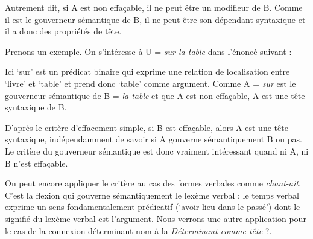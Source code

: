 Autrement dit, si A est non effaçable, il ne peut être un modifieur de B. Comme il est le gouverneur sémantique de B, il ne peut être son dépendant syntaxique et il a donc des propriétés de tête.

Prenons un exemple. On s’intéresse à U = \textit{sur la table} dans l’énoncé suivant :

\z

Ici ‘sur’ est un prédicat binaire qui exprime une relation de localisation entre ‘livre’ et ‘table’ et prend donc ‘table’ comme argument. Comme A = \textit{sur} est le gouverneur sémantique de B = \textit{la table} et que A est non effaçable, A est une tête syntaxique de B.

D’après le critère d’effacement simple, si B est effaçable, alors A est une tête syntaxique, indépendamment de savoir si A gouverne sémantiquement B ou pas. Le critère du gouverneur sémantique est donc vraiment intéressant quand ni A, ni B n’est effaçable.

On peut encore appliquer le critère au cas des formes verbales comme \textit{chant-ait}. C’est la flexion qui gouverne sémantiquement le lexème verbal : le temps verbal exprime un sens fondamentalement prédicatif (‘avoir lieu dans le passé’) dont le signifié du lexème verbal est l’argument. Nous verrons une autre application pour le cas de la connexion déterminant-nom à la  \textit{Déterminant comme tête} ?.

